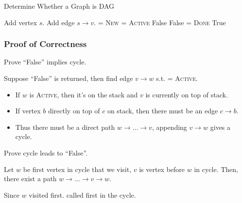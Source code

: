 \begin{algorithm}[H]
    \caption{Determine Whether a Graph is DAG}\label{algo:acyclicDFS}
    \begin{algorithmic}[1]
            \State Add vertex $s$.
                \State Add edge $s \rightarrow v$.
                \State {} = \textsc{New}
            \EndFor
            \Return {}
        \EndProcedure
            \State {} = \textsc{Active}
                    \Return False
                        \Return False
                    \EndIf
                \EndIf
            \EndFor
            \State {} = \textsc{Done}
            \Return True
        \EndProcedure
    \end{algorithmic}
\end{algorithm}

\subsubsection{Proof of Correctness}

Prove ``False'' implies cycle.

Suppose ``False'' is returned, then find edge $v \rightarrow w$
s.t.  = \textsc{Active}.
\begin{itemize}
    \item If $w$ is \textsc{Active}, then it's on the stack and
        $v$ is currently on top of stack.
    \item If vertex $b$ directly on top of $c$ on stack,
        then there must be an edge $c \rightarrow b$.
    \item Thus there must be a direct path $w \rightarrow \ldots \rightarrow v$,
        appending $v \rightarrow w$ gives a cycle.
\end{itemize}

\noindent Prove cycle leads to ``False''.

Let $w$ be first vertex in cycle that we visit,
$v$ is vertex before $w$ in cycle. Then, there exist a path
$w \rightarrow \ldots \rightarrow v \rightarrow w$.

Since $w$ visited first. 
called first in the cycle.


